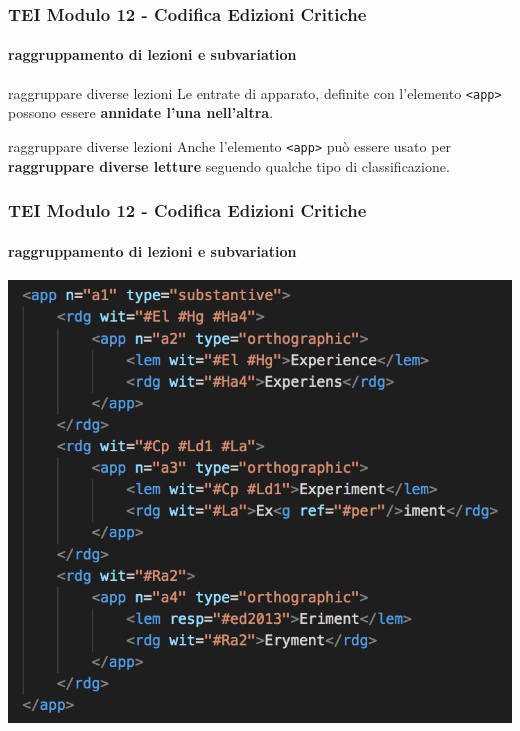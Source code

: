 \begin{frame}
    \frametitle{TEI Modulo 12 - Codifica Edizioni Critiche}
    \framesubtitle{raggruppamento di lezioni e subvariation}
    \addtocounter{nframe}{1}

  

    \begin{block}{raggruppare diverse lezioni}
       Le entrate di apparato, definite con l'elemento \texttt{<app>}  possono essere \textbf{annidate l'una nell'altra}.
    \end{block}
    \begin{block}{raggruppare diverse lezioni}
        Anche l'elemento \texttt{<app>} può essere usato per \textbf{raggruppare diverse letture} seguendo qualche tipo di classificazione.
     \end{block}


\end{frame}



\begin{frame}
    \frametitle{TEI Modulo 12 - Codifica Edizioni Critiche}
    \framesubtitle{raggruppamento di lezioni e subvariation}
    \addtocounter{nframe}{1}
    

    \begin{center}
        \includegraphics[width=.80\textwidth]{imgs/nest-app.png}
    \end{center}


\end{frame}

